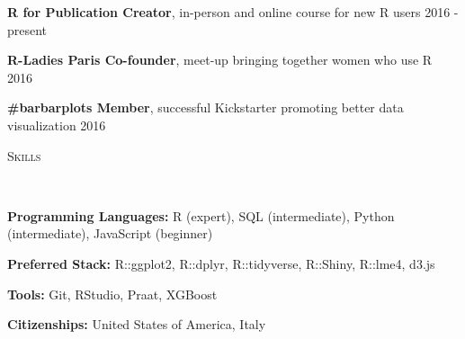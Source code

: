 \documentclass[9pt]{article}
\newenvironment{changemargin}[2]{%
  \begin{list}{}{%
    \setlength{\topsep}{0pt}%
    \setlength{\leftmargin}{#1}%
    \setlength{\rightmargin}{#2}%
    \setlength{\listparindent}{\parindent}%
    \setlength{\itemindent}{\parindent}%
    \setlength{\parsep}{\parskip}%
  }%
  \item[]}{\end{list}
}
\newcommand{\lineover}{
	\begin{changemargin}{-0.05in}{-0.05in}
		\vspace*{-8pt}
		\hrulefill \\
		\vspace*{-2pt}
	\end{changemargin}
}
\newcommand{\header}[1]{
	\begin{changemargin}{-0.5in}{-0.5in}
		\scshape{#1}\\
  	\lineover
	\end{changemargin}
}
\newenvironment{body} {
	\vspace*{-16pt}
	\begin{changemargin}{-0.25in}{-0.5in}
  }	
	{\end{changemargin}
}
\begin{document}
\begin{body}
	\vspace{14pt}
	
	\textbf{R for Publication Creator}, in-person and online course for new R users \hfill 2016 - present\\
	\medskip
	
	\textbf{R-Ladies Paris Co-founder}, meet-up bringing together women who use R \hfill 2016\\
	\medskip

	\textbf{\#barbarplots Member}, successful Kickstarter promoting better data visualization \hfill 2016\\
	\medskip
		
\end{body}

\smallskip

\header{\color{red}Skills}

\begin{body}
	\vspace{14pt}
	
	
	\textbf{Programming Languages:} R (expert), SQL (intermediate), Python (intermediate), JavaScript (beginner)\
	\medskip

	\textbf{Preferred Stack:} R::ggplot2, R::dplyr, R::tidyverse, R::Shiny, R::lme4, d3.js\\
	\medskip
	
	\textbf{Tools:} Git, RStudio, Praat, XGBoost
	\medskip
	
	\textbf{Citizenships:} United States of America, Italy\\
	\medskip

\end{body}
\end{document}
